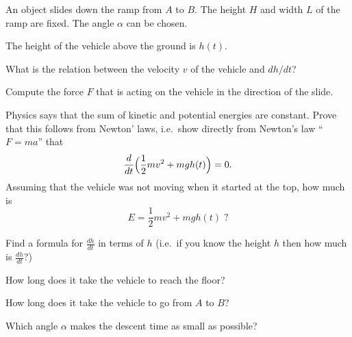 

An object slides down the ramp from $A$ to $B$.
The height $H$ and width $L$ of the ramp are fixed.  The angle $\alpha$ can be
chosen.

\begin{center}
  
\end{center}

The height of the vehicle above the ground is $h(t)$.

\problem What is the relation between the velocity $v$ of the vehicle and
$dh/dt$?

\problem
Compute the force $F$ that is acting on the vehicle in the direction of the
slide.

\problem Physics says that the sum of kinetic and potential energies are
constant.  Prove that this follows from Newton' laws, i.e.~show directly from
Newton's law ``$F=ma$'' that
\[
  \frac{d}{dt}\Bigl(\frac12 mv^2 + mgh(t)\Bigr) = 0.
\]
Assuming that the vehicle was not moving when it started at the top, how much is
\[
  E = \frac12 mv^2 + mgh(t) \; ?
\]

\problem Find a formula for $\frac{dh}{ dt}$ in terms of $h$ (i.e.~if you know
the height $h$ then how much is $\frac{dh}{dt}$?)

\problem How long does it take the vehicle to reach the floor?

\problem How long does it take the vehicle to go from $A$ to $B$?

\problem Which angle $\alpha$ makes the descent time as small as possible?

